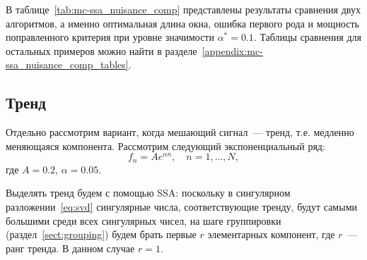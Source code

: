 \documentclass[specialist,
substylefile = spbu.rtx,
               subf,href,colorlinks=true, 12pt]{disser}
\theoremstyle{definition}
\begin{document}
В таблице~\ref{tab:mc-ssa_nuisance_comp} представлены результаты сравнения двух алгоритмов, а именно оптимальная длина окна, ошибка первого рода и мощность поправленного критерия при уровне значимости $\alpha^*=0.1$. Таблицы сравнения для остальных примеров можно найти в разделе~\ref{appendix:mc-ssa_nuisance_comp_tables}.

\subsection{Тренд}\label{sect:trend}
Отдельно рассмотрим вариант, когда мешающий сигнал~--- тренд, т.е. медленно меняющаяся компонента. Рассмотрим следующий экспоненциальный ряд:
\[
	f_n=A e^{\alpha n},\quad n=1,\ldots,N,
\]
где $A=0.2$, $\alpha=0.05$.

Выделять тренд будем с помощью SSA: поскольку в сингулярном разложении~\eqref{eq:svd} сингулярные числа, соответствующие тренду, будут самыми большими среди всех сингулярных чисел, на шаге группировки (раздел~\ref{sect:grouping}) будем брать первые $r$ элементарных компонент, где $r$~--- ранг тренда. В данном случае $r=1$.
\end{document}
